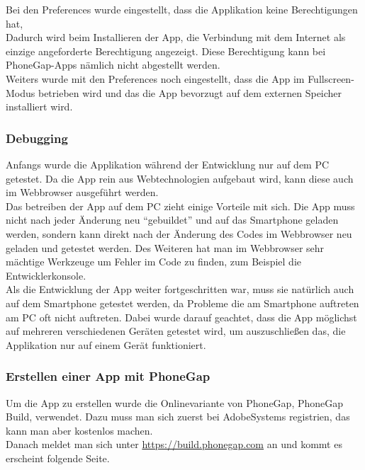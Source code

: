 Bei den Preferences wurde eingestellt, dass die Applikation keine Berechtigungen hat,\\



Dadurch wird beim Installieren der App, die Verbindung mit dem Internet als einzige angeforderte Berechtigung angezeigt. Diese Berechtigung kann bei PhoneGap-Apps nämlich nicht abgestellt werden.\\

Weiters wurde mit den Preferences noch eingestellt, dass die App im Fullscreen-Modus betrieben wird und das die App bevorzugt auf dem externen Speicher installiert wird.\\

\subsubsection{Debugging}
Anfangs wurde die Applikation während der Entwicklung nur auf dem PC getestet. Da die App rein aus Webtechnologien aufgebaut wird, kann diese auch im Webbrowser ausgeführt werden.\\
Das betreiben der App auf dem PC zieht einige Vorteile mit sich. Die App muss nicht nach jeder Änderung neu \enquote{gebuildet} und auf das Smartphone geladen werden, sondern kann direkt nach der Änderung des Codes im Webbrowser neu geladen und getestet werden. Des Weiteren hat man im Webbrowser sehr mächtige Werkzeuge um Fehler im Code zu finden, zum Beispiel die Entwicklerkonsole.\\
Als die Entwicklung der App weiter fortgeschritten war, muss sie natürlich auch auf dem Smartphone getestet werden, da Probleme die am Smartphone auftreten am PC oft nicht auftreten. Dabei wurde darauf geachtet, dass die App möglichst auf mehreren verschiedenen Geräten getestet wird, um auszuschließen das, die Applikation nur auf einem Gerät funktioniert.\\
\subsubsection{Erstellen einer App mit PhoneGap}
Um die App zu erstellen wurde die Onlinevariante von PhoneGap, PhoneGap Build, verwendet. Dazu muss man sich zuerst bei AdobeSystems registrien, das kann man aber kostenlos machen.\\
Danach meldet man sich unter \href{https://build.phonegap.com}{https://build.phonegap.com} an und kommt es erscheint folgende Seite.\\

